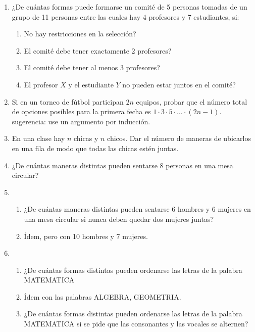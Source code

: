 \documentclass[12pt,spanish,makeidx]{amsbook}
\begin{document}
\begin {enumerate}
\smallskip

\item ¿De cu\'antas formas puede formarse un comit\'e de 5 personas tomadas de un grupo de 11 personas entre las cuales hay 4 profesores y 7 estudiantes, si:
\begin{enumerate}
	\item No hay restricciones en la selecci\'on?

	\item El comit\'e debe tener exactamente 2 profesores?

	\item El comit\'e debe tener al menos 3 profesores?

	\item El profesor $X$ y el estudiante $Y$ no pueden estar juntos en el comit\'e?
\end{enumerate}

\smallskip

\item Si en un torneo de f\'utbol participan $2n$ equipos, probar que el n\'umero total de opciones posibles para la primera fecha es $1\cdot 3\cdot 5 \cdot \dots \cdot (2n - 1)$. sugerencia: use un argumento por inducción. 

\smallskip

\item En una clase hay $n$ chicas y $n$ chicos. Dar el n\'umero de maneras de ubicarlos en una fila de modo que todas las chicas est\'en juntas.

\smallskip

\item ¿De cu\'antas maneras  distintas pueden sentarse 8 personas en una mesa circular?

\smallskip

\item \begin{enumerate}
	\item ¿De cu\'antas maneras distintas pueden sentarse 6 hombres y 6 mujeres en una mesa circular si nunca deben quedar dos mujeres juntas?
	\item \'Idem, pero con 10 hombres y 7 mujeres.
\end{enumerate}

\smallskip

\item 
\begin{enumerate}
	\item  ¿De cu\'antas formas distintas pueden ordenarse las letras de la palabra MATEMATICA
	\item \'Idem con las palabras ALGEBRA, GEOMETRIA.
	\item ¿De cu\'antas formas distintas pueden ordenarse las letras de la palabra MATEMATICA si se pide que las consonantes y las vocales se alternen?
\end{enumerate}


\end{enumerate}
\end{document}

